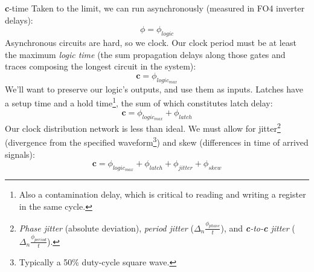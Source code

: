 \documentclass[mathserif,xcolor={dvipsnames,table}]{beamer}
\begin{document}
\begin{frame}{\textbf{c}-time}
\scriptsize{
Taken to the limit, we can run asynchronously (measured in FO4 inverter delays):
\begin{equation}
\phi = \phi_{logic}
\end{equation}
Asynchronous circuits are hard, so we clock. Our clock period must be at least
the maximum \textit{logic time} (the sum propagation delays along those gates
and traces composing the longest circuit in the system):
\begin{equation}
\textbf{c} = \phi_{logic_{max}}
\end{equation}
We'll want to preserve our logic's outputs, and use them as inputs. Latches have
a setup time and a hold time\footnote{\tiny{Also a contamination delay, which is critical
to reading and writing a register in the same cycle.}}, the sum of which constitutes latch delay:
\begin{equation}
\textbf{c} = \phi_{logic_{max}} + \phi_{latch}
\end{equation}
Our clock distribution network is less than ideal. We must allow for
jitter\footnote{\tiny{\textit{Phase jitter} (absolute deviation),
\textit{period jitter} ($\Delta_n \frac{\phi_{phase}}{t}$), and \textit{\textbf{c}-to-\textbf{c} jitter}
($\Delta_n \frac{\phi_{period}}{t}$).}}
 (divergence from the specified waveform\footnote{\tiny{Typically a 50\% duty-cycle
square wave.}}) and skew (differences in time of arrived signals):
\begin{equation}
\textbf{c} = \phi_{logic_{max}} + \phi_{latch} + \phi_{jitter} + \phi_{skew}
\end{equation}
}
\end{frame}
\end{document}
